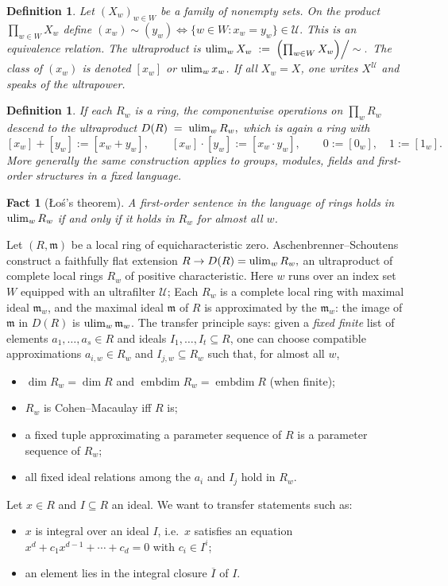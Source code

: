 \documentclass[11pt,a4paper]{amsart}
\numberwithin{equation}{section}
\newtheorem{fact}[theorem]{Fact}\newtheorem{claim}[theorem]{Claim}
\newtheorem{definition}[theorem]{Definition}
\newcommand{\U}{\mathcal{U}}
\newcommand{\m}{\mathfrak m}
\begin{document}
 \begin{definition}
 	Let $(X_w)_{w\in W}$ be a family of nonempty sets. On the product
 	$\prod_{w\in W}X_w$ define
 	$(x_w)\sim(y_w)
 	\iff
 	\{w\in W : x_w=y_w\}\in\U .$
 	This is an equivalence relation. The \emph{ultraproduct} is
 	$	\operatorname*{ulim}_{w} X_w
 	\;:=\;
 	\Bigl(\prod_{w\in W}X_w\Bigr)\Big/\sim .$
 	The class of $(x_w)$ is denoted $[x_w]$ or $\operatorname*{ulim}_w x_w$. If all
 	$X_w=X$, one writes $X^{\U}$ and speaks of the \emph{ultrapower}.
 \end{definition}
 
 \begin{definition}
 	If each $R_w$ is a ring, the componentwise operations on
 	$\prod_w R_w$ descend to the ultraproduct
 	$ D(R)\;=\;\operatorname*{ulim}_{w}R_w, $
 	which is again a ring with
 	$$[x_w]+[y_w]:=[x_w+y_w],\qquad
 	[x_w]\cdot[y_w]:=[x_w\cdot y_w],\qquad
 	0:=[0_w],\quad 1:=[1_w].	$$
 	More generally the same construction applies to groups, modules,
 	fields and first-order structures in a fixed language.
 \end{definition}
 
 \begin{fact}[{\L}o\'s's theorem]
 	A first-order sentence in the language of rings holds in
 	$\operatorname*{ulim}_w R_w$ if and only if it holds in $R_w$ for almost all $w$.
 \end{fact}

 
 Let $(R,\m)$ be a local ring of equicharacteristic zero. Aschenbrenner--Schoutens
 \cite[Theorem~4.3, Theorem~5.2, Lemmas~5.3--5.4]{AS} construct a
 faithfully flat extension
 $R\to D(R)=\operatorname*{ulim}_{w}R_w,$ 
 an ultraproduct of complete local rings $R_w$ of positive
 characteristic. Here $w$ runs over an index set $W$ equipped with an
 ultrafilter $\U$; Each $R_w$ is a complete local ring with maximal
 ideal $\m_w$, and the maximal ideal $\m$ of $R$ is approximated by the
 $\m_w$: the image of $\m$ in $D(R)$ is $\ulim_w \m_w$.
 The transfer principle says: given a \emph{fixed finite} list of
 elements $a_1,\dots,a_s\in R$ and ideals $I_1,\dots,I_t\subseteq R$,
 one can choose compatible approximations $a_{i,w}\in R_w$ and
 $I_{j,w}\subseteq R_w$ such that, for almost all $w$,
 \begin{itemize}
 	\item $\dim R_w=\dim R$ and $\operatorname{embdim}R_w=\operatorname{embdim}R$
 	(when finite);
 	\item $R_w$ is Cohen--Macaulay iff $R$ is;
 	\item a fixed tuple approximating a parameter sequence of $R$ is a
 	parameter sequence of $R_w$;
 	\item all fixed ideal relations among the $a_i$ and $I_j$  hold in $R_w$.
 \end{itemize}
 Let $x \in R$  and $I\subseteq R$ an ideal. We want to
 transfer statements such as:
 \begin{itemize}

 	\item $x$ is integral over an ideal $I$, i.e.\ $x$ satisfies an
 	equation $x^d+c_1x^{d-1}+\cdots+c_d=0$ with $c_i\in I^i$;
 	\item an element lies in the integral closure $\overline{I}$ of $I$.
 \end{itemize}
 
\end{document}
